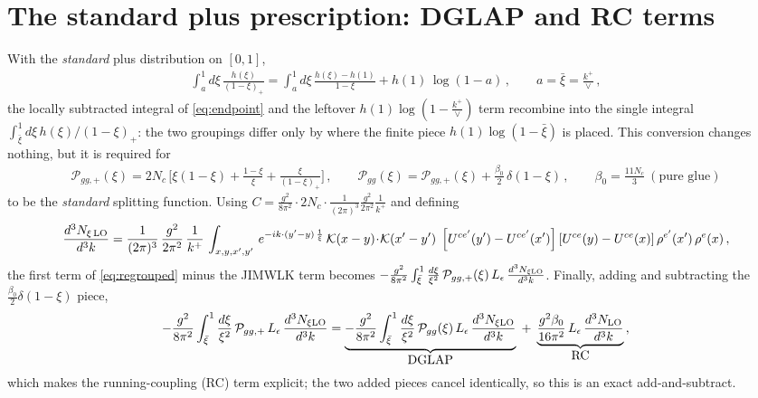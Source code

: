 \documentclass[10pt]{article}
\newcommand{\Leps}{L_{\epsilon}}
\newcommand{\KK}{\mathcal K(x-y)\!\cdot\!\mathcal K(x'-y')}
\newcommand{\Wbr}{\left[U^{ce'}(y') - U^{ce'}(x')\right] \left[U^{ce}(y) - U^{ce}(x)\right] \rho^{e'}(x')\, \rho^{e}(x)}
\begin{document}
\section{The standard plus prescription: DGLAP and RC terms}
With the \emph{standard} plus distribution on $[0,1]$,
\begin{align}\label{eq:stdplus}
\int_{a}^{1}d\xi\,\frac{h(\xi)}{(1-\xi)_{+}}=\int_{a}^{1}d\xi\,\frac{h(\xi)-h(1)}{1-\xi}+h(1)\,\log(1-a)\,,\qquad a=\bar\xi=\frac{k^{+}}{\vee}\,,
\end{align}
the locally subtracted integral of \eqref{eq:endpoint} and the leftover
$h(1)\log(1-\frac{k^{+}}{\vee})$ term recombine into the single integral
$\int_{\bar\xi}^{1}d\xi\,h(\xi)/(1-\xi)_{+}$: the two groupings differ only by where the finite
piece $h(1)\log(1-\bar\xi)$ is placed. This conversion changes nothing, but it is required for
\begin{align}\label{eq:pgg}
\mathcal{P}_{gg,+}(\xi) = 2N_{c}\,\Big[\xi(1-\xi)+\frac{1-\xi}{\xi}+\frac{\xi}{(1-\xi)_{+}}\Big]\,,
\qquad
\mathcal{P}_{gg}(\xi) = \mathcal{P}_{gg,+}(\xi) + \frac{\beta_{0}}{2}\,\delta(1-\xi)\,,\qquad
\beta_{0}=\frac{11N_{c}}{3}\ (\text{pure glue})
\end{align}
to be the \emph{standard} splitting function. Using $C=\frac{g^{2}}{8\pi^{2}}\cdot2N_{c}\cdot
\frac{1}{(2\pi)^{3}}\frac{g^{2}}{2\pi^{2}}\frac{1}{k^{+}}$ and defining
\begin{align}
\frac{d^{3}N_{\xi\,\rm LO}}{d^{3}k} = \frac{1}{(2\pi)^{3}}\, \frac{g^{2}}{2\pi^{2}}\, \frac{1}{k^{+}}\,\int_{x,y,x',y'}\, e^{-ik\cdot (y'-y)\,\frac{1}{\xi}}\, \KK\;\Wbr\,,
\end{align}
the first term of \eqref{eq:regrouped} minus the JIMWLK term becomes
$-\frac{g^{2}}{8\pi^{2}}\int_{\bar\xi}^{1}\frac{d\xi}{\xi^{2}}\,\mathcal P_{gg,+}(\xi)\,\Leps\,
\frac{d^{3}N_{\xi\rm LO}}{d^{3}k}$. Finally, adding and subtracting the
$\frac{\beta_{0}}{2}\delta(1-\xi)$ piece,
\begin{align}\label{eq:dglaprc}
-\frac{g^{2}}{8\pi^{2}}\int_{\bar\xi}^{1}\frac{d\xi}{\xi^{2}}\,\mathcal P_{gg,+}\,\Leps\,\frac{d^{3}N_{\xi\rm LO}}{d^{3}k}
=\underbrace{-\frac{g^{2}}{8\pi^{2}}\int_{\bar\xi}^{1}\frac{d\xi}{\xi^{2}}\,\mathcal P_{gg}(\xi)\,\Leps\,\frac{d^{3}N_{\xi\rm LO}}{d^{3}k}}_{\textstyle\rm DGLAP}
\;+\;\underbrace{\frac{g^{2}\beta_{0}}{16\pi^{2}}\,\Leps\,\frac{d^{3}N_{\rm LO}}{d^{3}k}}_{\textstyle\rm RC}\,,
\end{align}
which makes the running-coupling (RC) term explicit; the two added pieces cancel identically, so
this is an exact add-and-subtract.
\end{document}
